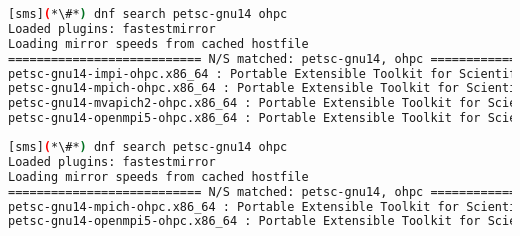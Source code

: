 \begin{lstlisting}[language=bash,keywords={}]
[sms](*\#*) dnf search petsc-gnu14 ohpc
Loaded plugins: fastestmirror
Loading mirror speeds from cached hostfile
=========================== N/S matched: petsc-gnu14, ohpc ===========================
petsc-gnu14-impi-ohpc.x86_64 : Portable Extensible Toolkit for Scientific Computation
petsc-gnu14-mpich-ohpc.x86_64 : Portable Extensible Toolkit for Scientific Computation
petsc-gnu14-mvapich2-ohpc.x86_64 : Portable Extensible Toolkit for Scientific Computation
petsc-gnu14-openmpi5-ohpc.x86_64 : Portable Extensible Toolkit for Scientific Computation
\end{lstlisting}
\fi

\begin{lstlisting}[language=bash,keywords={}]
[sms](*\#*) dnf search petsc-gnu14 ohpc
Loaded plugins: fastestmirror
Loading mirror speeds from cached hostfile
=========================== N/S matched: petsc-gnu14, ohpc ===========================
petsc-gnu14-mpich-ohpc.x86_64 : Portable Extensible Toolkit for Scientific Computation
petsc-gnu14-openmpi5-ohpc.x86_64 : Portable Extensible Toolkit for Scientific Computation
\end{lstlisting}
\fi

